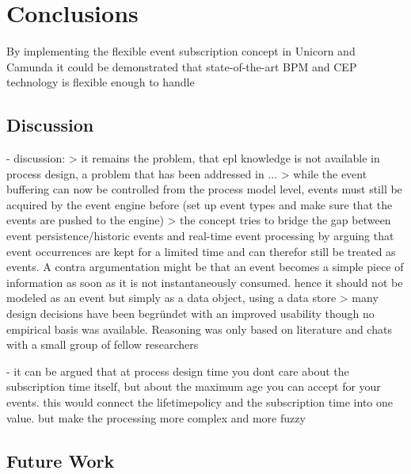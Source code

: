 \chapter{Conclusions}\label{ch:conclusion}



By implementing the flexible event subscription concept in Unicorn and Camunda it could be demonstrated that state-of-the-art BPM and CEP technology is flexible enough to handle 

\section{Discussion}

- discussion:
> it remains the problem, that epl knowledge is not available in process design, a problem that has been addressed in ...
> while the event buffering can now be controlled from the process model level, events must still be acquired by the event engine before (set up event types and make sure that the events are pushed to the engine)
> the concept tries to bridge the gap between event persistence/historic events and real-time event processing by arguing that event occurrences are kept for a limited time and can therefor still be treated as events. A contra argumentation might be that an event becomes a simple piece of information as soon as it is not instantaneously consumed. hence it should not be modeled as an event but simply as a data object, using a data store
> many design decisions have been begründet with an improved usability though no empirical basis was available. Reasoning was only based on literature and chats with a small group of fellow researchers

- it can be argued that at process design time you dont care about the subscription time itself, but about the maximum age you can accept for your events. this would connect the lifetimepolicy and the subscription time into one value. but make the processing more complex and more fuzzy

\section{Future Work}

